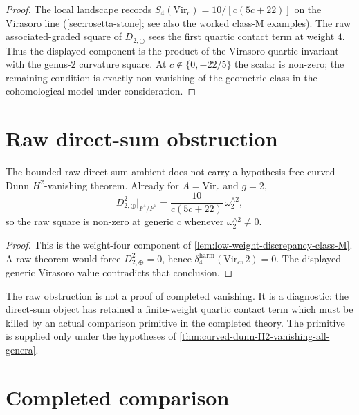 \begin{proof}
The local landscape records
\(S_{4}(\mathrm{Vir}_{c})=10/[c(5c+22)]\) on the Virasoro line
(\autoref{sec:rosetta-stone}; see also the worked class-\(\mathrm{M}\)
examples). The raw associated-graded square of \(D_{2,\oplus}\) sees
the first quartic contact term at weight \(4\). Thus the displayed
component is the product of the Virasoro quartic invariant with the
genus-\(2\) curvature square. At \(c\notin\{0,-22/5\}\) the scalar is
non-zero; the remaining condition is exactly non-vanishing of the
geometric class in the cohomological model under consideration.
\end{proof}

\section{Raw direct-sum obstruction}
\label{sec:raw-direct-sum-failure}

\begin{theorem}
\label{thm:curved-dunn-class-M-raw-direct-sum-fails}
The bounded raw direct-sum ambient does not carry a hypothesis-free
curved-Dunn \(H^{2}\)-vanishing theorem. Already for
\(A=\mathrm{Vir}_{c}\) and \(g=2\),
\[
 D_{2,\oplus}^{2}\Big|_{F^{4}/F^{5}}
 =
 \frac{10}{c(5c+22)}\,\omega_{2}^{\wedge 2},
\]
so the raw square is non-zero at generic \(c\) whenever
\(\omega_{2}^{\wedge2}\neq0\).
\end{theorem}

\begin{proof}
This is the weight-four component of
\autoref{lem:low-weight-discrepancy-class-M}. A raw theorem would
force \(D_{2,\oplus}^{2}=0\), hence
\(\delta_{4}^{\mathrm{harm}}(\mathrm{Vir}_{c},2)=0\). The displayed
generic Virasoro value contradicts that conclusion.
\end{proof}

\begin{remark}
\label{rem:direct-sum-obstruction-is-ambient-choice}
The raw obstruction is not a proof of completed vanishing. It is a
diagnostic: the direct-sum object has retained a finite-weight
quartic contact term which must be killed by an actual comparison
primitive in the completed theory. The primitive is supplied only
under the hypotheses of
\autoref{thm:curved-dunn-H2-vanishing-all-genera}.
\end{remark}

\section{Completed comparison}
\label{sec:pro-ambient-reconstitution}

